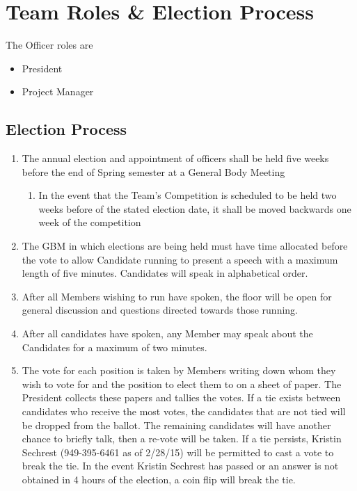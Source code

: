 \section{Team Roles \& Election Process}
\label{roles}
The Officer roles are
\begin{itemize}
\item President
\item Project Manager
\end{itemize}

\subsection{Election Process}
\label{roles:process}
\begin{enumerate}
\item The annual election and appointment of officers shall be held five weeks before the end of Spring semester at a General Body Meeting
    \begin{enumerate}
    \item  In the event that the Team’s Competition is scheduled to be held two weeks before of the stated election date, it shall be moved backwards one week of the competition
    \end{enumerate}
\item The GBM in which elections are being held must have time allocated before the vote to allow Candidate running to present a speech with a maximum length of five minutes. Candidates will speak in alphabetical order.
\item After all Members wishing to run have spoken, the floor will be open for general discussion and questions directed towards those running.
\item After all candidates have spoken, any Member may speak about the Candidates for a maximum of two minutes.
\item The vote for each position is taken by Members writing down whom they wish to vote for and the position to elect them to on a sheet of paper. The President collects these papers and tallies the votes. If a tie exists between candidates who receive the most votes, the candidates that are not tied will be dropped from the ballot. The remaining candidates will have another chance to briefly talk, then a re-vote will be taken. If a tie persists, Kristin Sechrest (949-395-6461 as of 2/28/15) will be permitted to cast a vote to break the tie. In the event Kristin Sechrest has passed or an answer is not obtained in 4 hours of the election, a coin flip will break the tie. 

\end{enumerate}
